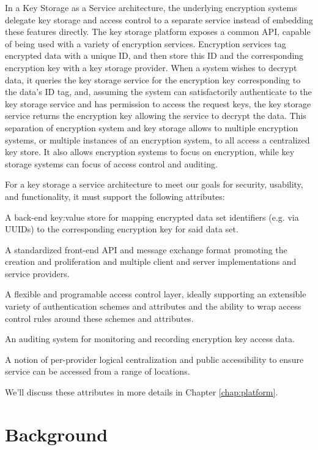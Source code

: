 In a Key Storage as a Service architecture, the underlying encryption
systems delegate key storage and access control to a separate service
instead of embedding these features directly. The key storage platform
exposes a common API, capable of being used with a variety of
encryption services. Encryption services tag encrypted data with a
unique ID, and then store this ID and the corresponding encryption key
with a key storage provider. When a system wishes to decrypt data, it
queries the key storage service for the encryption key corresponding
to the data's ID tag, and, assuming the system can satisfactorily
authenticate to the key storage service and has permission to access the
request keys, the key storage service returns the encryption key
allowing the service to decrypt the data. This separation of encryption
system and key storage allows to multiple encryption systems, or
multiple instances of an encryption system, to all access a centralized
key store. It also allows encryption systems to focus on encryption,
while key storage systems can focus of access control and auditing.

For a key storage a service architecture to meet our goals for
security, usability, and functionality, it must support the following
attributes:

\begin{packed_item}
\item A back-end key:value store for mapping encrypted data set
  identifiers (e.g. via UUIDs) to the corresponding encryption key for
  said data set.
\item A standardized front-end API and message exchange format
  promoting the creation and proliferation and multiple client and
  server implementations and service providers.
\item A flexible and programable access control layer,
  ideally supporting an extensible variety of authentication schemes and
  attributes and the ability to wrap access control rules around these
  schemes and attributes.
\item An auditing system for monitoring and recording
  encryption key access data.
\item A notion of per-provider logical centralization and public
  accessibility to ensure service can be accessed from a range of
  locations.
\end{packed_item}

We'll discuss these attributes in more details in Chapter
\ref{chap:platform}.

\section{Background}

